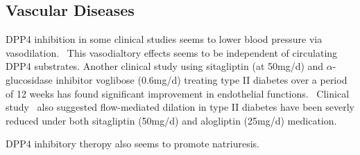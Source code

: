 \subsection{Vascular Diseases}
DPP4 inhibition in some clinical studies seems to lower blood pressure via vasodilation.~\cite{Kröller-Schön2012} This vasodialtory effects seems to be independent of circulating DPP4 substrates. Another clinical study using sitagliptin (at 50mg/d) and $\alpha$-glucosidase inhibitor voglibose (0.6mg/d) treating type II diabetes over a period of 12 weeks has found significant improvement in endothelial functions.~\cite{Nakamura2014} Clinical study~\cite{Ayaori2013} also suggested flow-mediated dilation in type II diabetes have been severly reduced under both sitagliptin (50mg/d) and alogliptin (25mg/d) medication.
\par 
DPP4 inhibitory theropy also seems to promote natriuresis. 